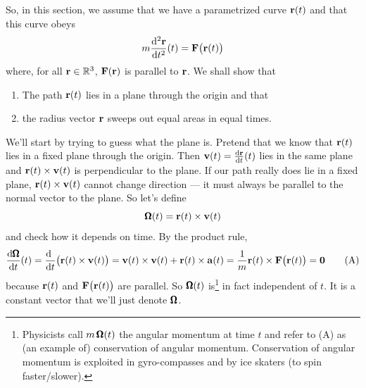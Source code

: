 So, in this section, we assume that we have a parametrized
curve $\mathbf{r}(t)$ and that this curve obeys
\begin{equation*}
m\difftwo{\vr}{t}(t) = \vF\big(\vr(t)\big)
\end{equation*}
where, for all $\mathbf{r}\in\mathbb{R}^3$, $\mathbf{F}(\mathbf{r})$ is parallel to $\mathbf{r}$. We shall show that
\begin{enumerate}\itemsep1pt \parskip0pt  %
\item 
The path $\mathbf{r}(t)$ lies in a plane through the origin and that
\item
the radius vector $\mathbf{r}$ sweeps out equal areas in equal times. 
\end{enumerate}
We'll start by trying to guess what the plane is. Pretend that we know that 
$\mathbf{r}(t)$ lies in a fixed plane through the origin. Then 
$\vv(t)=\diff{\vr}{t}(t)$ lies in the same plane and 
$\mathbf{r}(t)\times\mathbf{v}(t)$ is perpendicular to the plane. If our path really does
lie in a fixed plane, $\mathbf{r}(t)\times\mathbf{v}(t)$ cannot change direction --- it must 
always be parallel to the normal vector to the plane. So let's define
\begin{equation*}
\pmb{\Omega}(t) = \mathbf{r}(t)\times\mathbf{v}(t)
\end{equation*}
and check how it depends on time. By the product rule,
\begin{equation}
\diff{\vOm}{t}(t) =\diff{\ }{t}\big(\vr(t)\times\vv(t)\big)
=\vv(t)\times\vv(t) + \vr(t)\times\va(t)
=\frac{1}{m}\vr(t)\times\vF\big(\vr(t)\big)
=\vZero
\tag{A}\end{equation}
because $\mathbf{r}(t)$ and $\mathbf{F}\big(\mathbf{r}(t)\big)$ are parallel.
So $\pmb{\Omega}(t)$ is\footnote{Physicists call $m\,\pmb{\Omega}(t)$ the angular momentum at time $t$ and refer to (A) as (an example of) conservation of angular momentum.
Conservation of angular momentum is exploited in gyro-compasses and by 
ice skaters (to spin faster/slower).} 
in fact independent of $t$. It is a constant vector that
we'll just denote $\pmb{\Omega}$. 

